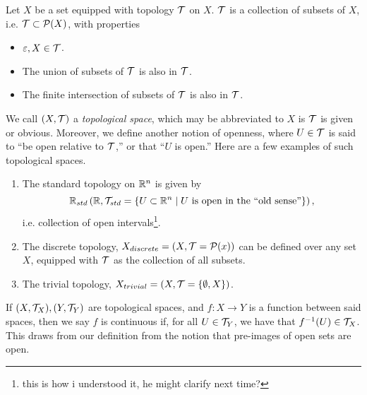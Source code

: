 \begin{definition}
    Let $X$ be a set equipped with topology $\mathcal T$ on $X$. $\mathcal T$ is a collection of subsets of $X$, i.e. $\mathcal T \subset \mathcal P(X)$, with properties
    \begin{itemize}
        \item $\varepsilon, X \in \mathcal T$.
        \item The union of subsets of $\mathcal T$ is also in $\mathcal T$.
        \item The finite intersection of subsets of $\mathcal T$ is also in $\mathcal T$.
    \end{itemize}
\end{definition}
\noindent We call $(X, \mathcal T)$ a \textit{topological space}, which may be abbreviated to $X$ is $\mathcal T$ is given or obvious. Moreover, we define another notion of openness, where $U \in \mathcal T$ is said to ``be open relative to $\mathcal T$,'' or that ``$U$ is open.'' Here are a few examples of such topological spaces.
\begin{enumerate}[label=(\alph*)]
    \item The standard topology on $\mathbb R^n$ is given by
    \[ \mathbb R_{std} \left(\mathbb R, \mathcal T_{std} = \{ U \subset \mathbb R^n \mid U \text{ is open in the ``old sense''}\}\right), \]
    i.e. collection of open intervals\footnote{this is how i understood it, he might clarify next time?}.
    \item The discrete topology, $X_{discrete} = (X, \mathcal T = \mathcal P(x))$ can be defined over any set $X$, equipped with $\mathcal T$ as the collection of all subsets.
    \item The trivial topology, $X_{trivial} = (X, \mathcal T = \{\emptyset, X\})$.
\end{enumerate}

\begin{definition}
    If $(X, \mathcal T_X), (Y, \mathcal T_Y)$ are topological spaces, and $f : X \to Y$ is a function between said spaces, then we say $f$ is continuous if, for all $U \in \mathcal T_Y$, we have that $f^{-1}(U) \in \mathcal T_X$. This draws from our definition from the notion that pre-images of open sets are open.
\end{definition}

